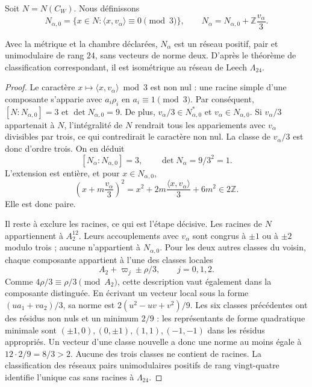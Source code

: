 Soit $N=N(C_W)$. Nous définissons
\begin{equation}
 N_{\alpha,0}=\{x\in N:\langle x,v_\alpha\rangle\equiv0\pmod3\},
 \qquad
 N_\alpha=N_{\alpha,0}+\mathbb Z\frac{v_\alpha}{3}.
 \label{exc:vecino}
\end{equation}

\begin{theorem}
\label{exc:teorema-leech}
Avec la métrique et la chambre déclarées, $N_\alpha$ est un réseau
positif, pair et unimodulaire de rang $24$, sans vecteurs de norme deux.
D'après le théorème de classification correspondant, il est isométrique au
réseau de Leech $\Lambda_{24}$.
\end{theorem}

\begin{proof}
Le caractère $x\mapsto\langle x,v_\alpha\rangle\bmod3$ est non nul :
une racine simple d'une composante s'apparie avec $a_i\rho_i$ en
$a_i\equiv1\pmod3$. Par conséquent, $[N:N_{\alpha,0}]=3$ et
$\det N_{\alpha,0}=9$. De plus,
$v_\alpha/3\in N_{\alpha,0}^*$ et $v_\alpha\in N_{\alpha,0}$.
Si $v_\alpha/3$ appartenait à $N$, l'intégralité de $N$ rendrait
tous les appariements avec $v_\alpha$ divisibles par trois,
ce qui contredirait le caractère non nul. La classe de $v_\alpha/3$ est
donc d'ordre trois. On en déduit
\[
 [N_\alpha:N_{\alpha,0}]=3,
 \qquad \det N_\alpha=9/3^2=1.
\]
L'extension est entière, et pour $x\in N_{\alpha,0}$,
\[
 \left(x+m\frac{v_\alpha}{3}\right)^2
   =x^2+2m\frac{\langle x,v_\alpha\rangle}{3}+6m^2
   \in2\mathbb Z.
\]
Elle est donc paire.

Il reste à exclure les racines, ce qui est l'étape décisive. Les racines de $N$ appartiennent à $A_2^{12}$. Leurs accouplements avec $v_\alpha$ sont congrus à $\pm1$ ou à $\pm2$ modulo trois ; aucune n'appartient à $N_{\alpha,0}$. Pour les deux autres classes du voisin, chaque composante appartient à l'une des classes locales
\[
 A_2+\varpi_j\pm\rho/3,\qquad j=0,1,2.
\]
Comme $4\rho/3\equiv\rho/3\pmod{A_2}$, cette description vaut
également dans la composante distinguée. En écrivant un vecteur local
sous la forme $(u a_1+v a_2)/3$, sa norme est
$2(u^2-uv+v^2)/9$. Les six classes précédentes ont des résidus non
nuls et un minimum $2/9$ : les représentants de forme quadratique minimale
sont $(\pm1,0),(0,\pm1),(1,1),(-1,-1)$ dans les résidus appropriés.
Un vecteur d'une classe nouvelle a donc une norme au moins égale à
$12\cdot2/9=8/3>2$. Aucune des trois classes ne contient de racines.
La classification des réseaux pairs unimodulaires positifs de
rang vingt-quatre identifie l'unique cas sans racines à
$\Lambda_{24}$.
\end{proof}

